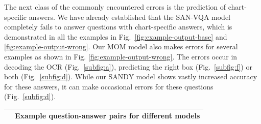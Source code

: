 \documentclass[10pt,twocolumn,letterpaper]{article}
\begin{document}
\begin{appendices}
The next class of the commonly encountered errors is the prediction of chart-specific answers. We have already established that the SAN-VQA model completely fails to answer questions with chart-specific answers, which is demonstrated in all the examples in Fig.~\ref{fig:example-output-base} and \ref{fig:example-output-wrong}. Our MOM model also makes errors for several examples as shown in Fig. \ref{fig:example-output-wrong}. The errors occur in decoding the OCR (Fig.~\ref{subfig:a}), predicting the right box (Fig.~\ref{subfig:f}) or both (Fig.~\ref{subfig:d}). While our SANDY model shows vastly increased accuracy for these answers, it can make occasional errors for these questions (Fig.~\ref{subfig:d}).
\vspace{100px}
\begin{table}[!h]
\centering
\huge
\begin{tabular}{@{}lrrrrrr@{}}
\toprule
                     & \multicolumn{6}{c}{\textbf{Example question-answer pairs for different models}} \\ \bottomrule


\end{tabular}
\end{table}
\end{appendices}
\end{document}
